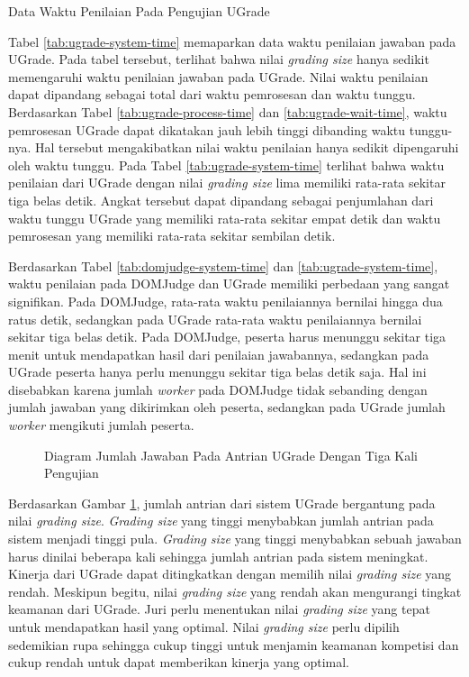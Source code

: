 \begin{table}[ht!]
    \centering
    
    \caption{Data Waktu Penilaian Pada Pengujian UGrade}
    \label{tab:ugrade-system-time}
\end{table}

\par Tabel \ref{tab:ugrade-system-time} memaparkan data waktu penilaian jawaban pada UGrade. Pada tabel tersebut, terlihat bahwa nilai \textit{grading size} hanya sedikit memengaruhi waktu penilaian jawaban pada UGrade. Nilai waktu penilaian dapat dipandang sebagai total dari waktu pemrosesan dan waktu tunggu. Berdasarkan Tabel \ref{tab:ugrade-process-time} dan \ref{tab:ugrade-wait-time}, waktu pemrosesan UGrade dapat dikatakan jauh lebih tinggi dibanding waktu tunggu-nya. Hal tersebut mengakibatkan nilai waktu penilaian hanya sedikit dipengaruhi oleh waktu tunggu. Pada Tabel \ref{tab:ugrade-system-time} terlihat bahwa waktu penilaian dari UGrade dengan nilai \textit{grading size} lima memiliki rata-rata sekitar tiga belas detik. Angkat tersebut dapat dipandang sebagai penjumlahan dari waktu tunggu UGrade yang memiliki rata-rata sekitar empat detik dan waktu pemrosesan yang memiliki rata-rata sekitar sembilan detik.

\par Berdasarkan Tabel \ref{tab:domjudge-system-time} dan \ref{tab:ugrade-system-time}, waktu penilaian pada DOMJudge dan UGrade memiliki perbedaan yang sangat signifikan. Pada DOMJudge, rata-rata waktu penilaiannya bernilai hingga dua ratus detik, sedangkan pada UGrade rata-rata waktu penilaiannya bernilai sekitar tiga belas detik. Pada DOMJudge, peserta harus menunggu sekitar tiga menit untuk mendapatkan hasil dari penilaian jawabannya, sedangkan pada UGrade peserta hanya perlu menunggu sekitar tiga belas detik saja. Hal ini disebabkan karena jumlah \textit{worker} pada DOMJudge tidak sebanding dengan jumlah jawaban yang dikirimkan oleh peserta, sedangkan pada UGrade jumlah \textit{worker} mengikuti jumlah peserta.

\begin{figure}[ht!]
    \centering
    
    \caption{Diagram Jumlah Jawaban Pada Antrian UGrade Dengan Tiga Kali Pengujian}
    \label{fig:ugrade-queue}
\end{figure}

\par Berdasarkan Gambar \ref{fig:ugrade-queue}, jumlah antrian dari sistem UGrade bergantung pada nilai \textit{grading size}. \textit{Grading size} yang tinggi menybabkan jumlah antrian pada sistem menjadi tinggi pula. \textit{Grading size} yang tinggi menybabkan sebuah jawaban harus dinilai beberapa kali sehingga jumlah antrian pada sistem meningkat. Kinerja dari UGrade dapat ditingkatkan dengan memilih nilai \textit{grading size} yang rendah. Meskipun begitu, nilai \textit{grading size} yang rendah akan mengurangi tingkat keamanan dari UGrade. Juri perlu menentukan nilai \textit{grading size} yang tepat untuk mendapatkan hasil yang optimal. Nilai \textit{grading size} perlu dipilih sedemikian rupa sehingga cukup tinggi untuk menjamin keamanan kompetisi dan cukup rendah untuk dapat memberikan kinerja yang optimal.

